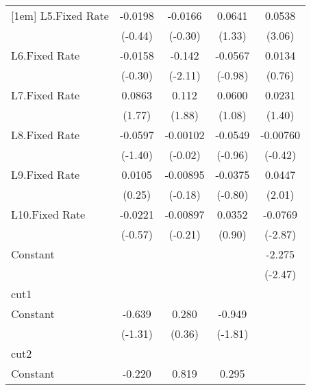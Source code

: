 {\begin{longtable}{l*{4}{c}}
[1em]
L5.Fixed Rate   &  -0.0198         &  -0.0166         &   0.0641         &   0.0538\sym{**} \\
                &  (-0.44)         &  (-0.30)         &   (1.33)         &   (3.06)         \\
[1em]
L6.Fixed Rate   &  -0.0158         &   -0.142\sym{*}  &  -0.0567         &   0.0134         \\
                &  (-0.30)         &  (-2.11)         &  (-0.98)         &   (0.76)         \\
[1em]
L7.Fixed Rate   &   0.0863         &    0.112         &   0.0600         &   0.0231         \\
                &   (1.77)         &   (1.88)         &   (1.08)         &   (1.40)         \\
[1em]
L8.Fixed Rate   &  -0.0597         & -0.00102         &  -0.0549         & -0.00760         \\
                &  (-1.40)         &  (-0.02)         &  (-0.96)         &  (-0.42)         \\
[1em]
L9.Fixed Rate   &   0.0105         & -0.00895         &  -0.0375         &   0.0447\sym{*}  \\
                &   (0.25)         &  (-0.18)         &  (-0.80)         &   (2.01)         \\
[1em]
L10.Fixed Rate  &  -0.0221         & -0.00897         &   0.0352         &  -0.0769\sym{**} \\
                &  (-0.57)         &  (-0.21)         &   (0.90)         &  (-2.87)         \\
[1em]
Constant        &                  &                  &                  &   -2.275\sym{*}  \\
                &                  &                  &                  &  (-2.47)         \\
\hline
cut1            &                  &                  &                  &                  \\
Constant        &   -0.639         &    0.280         &   -0.949         &                  \\
                &  (-1.31)         &   (0.36)         &  (-1.81)         &                  \\
\hline
cut2            &                  &                  &                  &                  \\
Constant        &   -0.220         &    0.819         &    0.295         &                  \\

\end{longtable}}
